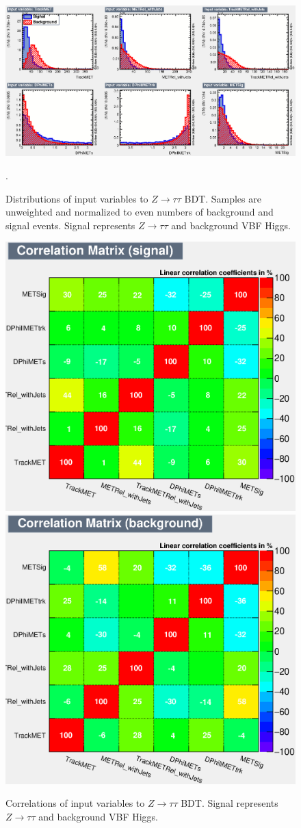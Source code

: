 \begin{figure}[!htbp]
    \centering
    \includegraphics[width=0.85\linewidth]{Pictures/variables_id_c1.eps}
    \caption{Distributions of input variables to $Z\rightarrow\tau\tau$ BDT. Samples are unweighted and normalized to even numbers of background and signal events. Signal represents $Z\rightarrow\tau\tau$ and background VBF Higgs.}.
    \label{fig:ZjetsBDTinput}
\end{figure}
\begin{figure}[!htbp]
\centering
  \includegraphics[width=.4\linewidth]{Pictures/CorrelationMatrixS.eps}
  \includegraphics[width=.4\linewidth]{Pictures/CorrelationMatrixB.eps}
\caption{Correlations of input variables to $Z\rightarrow\tau\tau$ BDT. Signal represents $Z\rightarrow\tau\tau$ and background VBF Higgs.}
\label{fig:ZjetscorrSB}
\end{figure}
